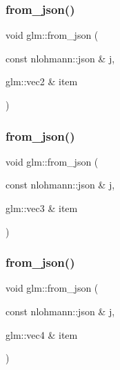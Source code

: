 \subsubsection{\texorpdfstring{from\+\_\+json()}{from\_json()}\hspace{0.1cm}{\footnotesize\ttfamily [1/5]}}
{\footnotesize\ttfamily void glm\+::from\+\_\+json (\begin{DoxyParamCaption}\item[{const nlohmann\+::json \&}]{j,  }\item[{glm\+::vec2 \&}]{item }\end{DoxyParamCaption})}

\mbox{\label{namespaceglm_acf0c993cd2af5d0ca0088ab3a8a2bc96}} 
\subsubsection{\texorpdfstring{from\+\_\+json()}{from\_json()}\hspace{0.1cm}{\footnotesize\ttfamily [2/5]}}
{\footnotesize\ttfamily void glm\+::from\+\_\+json (\begin{DoxyParamCaption}\item[{const nlohmann\+::json \&}]{j,  }\item[{glm\+::vec3 \&}]{item }\end{DoxyParamCaption})}

\mbox{\label{namespaceglm_a2ee25c36cde043f5aa75844f4948890f}} 
\subsubsection{\texorpdfstring{from\+\_\+json()}{from\_json()}\hspace{0.1cm}{\footnotesize\ttfamily [3/5]}}
{\footnotesize\ttfamily void glm\+::from\+\_\+json (\begin{DoxyParamCaption}\item[{const nlohmann\+::json \&}]{j,  }\item[{glm\+::vec4 \&}]{item }\end{DoxyParamCaption})}

\mbox{\label{namespaceglm_ab6b43ce4c40859cdef9c5dae131ec7b7}} 
